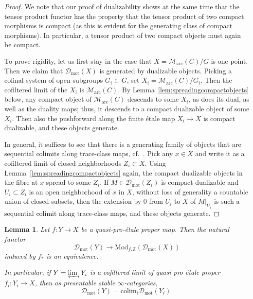 \documentclass[11pt]{amsart}
\numberwithin{equation}{section}
\numberwithin{theorem}{section}
\newtheorem{lemma}[theorem]{Lemma}
\theoremstyle{definition}
\begin{document}
\begin{proof}
We note that our proof of dualizability shows at the same time that the tensor product functor has the property that the tensor product of two compact morphisms is compact (as this is evident for the generating class of compact morphisms). In particular, a tensor product of two compact objects must again be compact.

To prove rigidity, let us first stay in the case that $X=\mathcal M_{\mathrm{arc}}(C)/G$ is one point. Then we claim that $\mathcal D_{\mathrm{mot}}(X)$ is generated by dualizable objects. Picking a cofinal system of open subgroups $G_i\subset G$, set $X_i=\mathcal M_{\mathrm{arc}}(C)/G_i$. Then the cofiltered limit of the $X_i$ is $\mathcal M_{\mathrm{arc}}(C)$. By Lemma~\ref{lem:spreadingcompactobjects} below, any compact object of $\mathcal M_{\mathrm{arc}}(C)$ descends to some $X_i$, as does its dual, as well as the duality maps; thus, it descends to a compact dualizable object of some $X_i$. Then also the pushforward along the finite \'etale map $X_i\to X$ is compact dualizable, and these objects generate.

In general, it suffices to see that there is a generating family of objects that are sequential colimits along trace-class maps, cf.~\cite[Corollary 4.57]{RamziRigid}. Pick any $x\in X$ and write it as a cofiltered limit of closed neighborhoods $Z_i\subset X$. Using Lemma~\ref{lem:spreadingcompactobjects} again, the compact dualizable objects in the fibre at $x$ spread to some $Z_i$. If $M\in \mathcal D_{\mathrm{mot}}(Z_i)$ is compact dualizable and $U_i\subset Z_i$ is an open neighborhood of $x$ in $X$, without loss of generality a countable union of closed subsets, then the extension by $0$ from $U_i$ to $X$ of $M|_{U_i}$ is such a sequential colimit along trace-class maps, and these objects generate.
\end{proof}

\begin{lemma}\label{lem:quasiproetalebarrbeck} Let $f: Y\to X$ be a quasi-pro-\'etale proper map. Then the natural functor
\[
\mathcal D_{\mathrm{mot}}(Y)\to \mathrm{Mod}_{f_\ast \mathbb Z}(\mathcal D_{\mathrm{mot}}(X))
\]
induced by $f_\ast$ is an equivalence.

In particular, if $Y=\varprojlim_i Y_i$ is a cofiltered limit of quasi-pro-\'etale proper $f_i: Y_i\to X$, then as presentable stable $\infty$-categories,
\[
\mathcal D_{\mathrm{mot}}(Y) = \mathrm{colim}_i \mathcal D_{\mathrm{mot}}(Y_i).
\]
\end{lemma}
\end{document}
